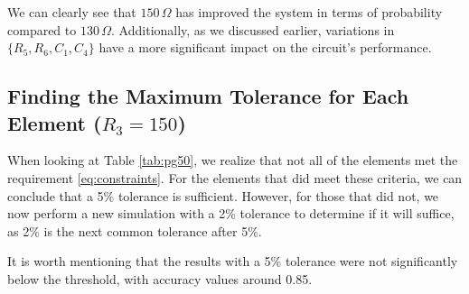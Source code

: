 \documentclass[hidelinks,12pt]{article}
\begin{document}
	We can clearly see that \(150\,\Omega\) has improved the system in terms of probability compared to \(130\,\Omega\). Additionally, as we discussed earlier, variations in \( \{R_5, R_6, C_1, C_4\} \) have a more significant impact on the circuit's performance.
	
	
	\subsection{Finding the Maximum Tolerance for Each Element (\( R_3 = 150 \))}
	When looking at Table \textcolor{Cyan}{\ref{tab:pg50}}, we realize that not all of the elements met the requirement \textcolor{Cyan}{\ref{eq:constraints}}. For the elements that did meet these criteria, we can conclude that a 5\% tolerance is sufficient. However, for those that did not, we now perform a new simulation with a 2\% tolerance to determine if it will suffice, as 2\% is the next common tolerance after 5\%.
	
	It is worth mentioning that the results with a 5\% tolerance were not significantly below the threshold, with accuracy values around 0.85.
	
\end{document}
